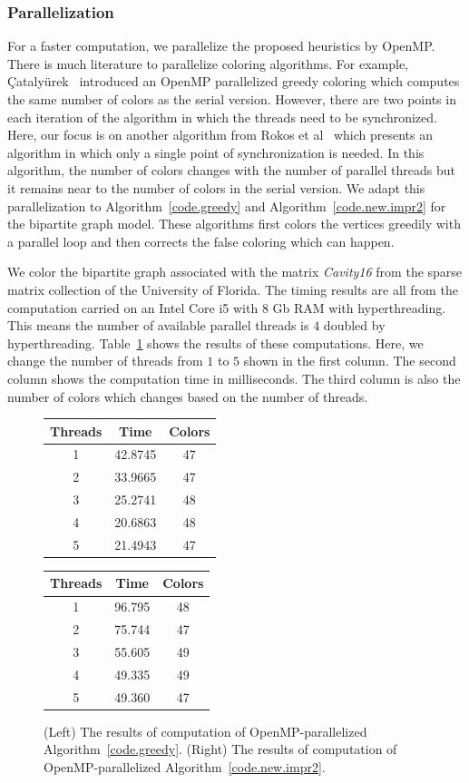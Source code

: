 \documentclass[12pt, twoside,a4paper,toc=bibliography]{scrbook}
\newcommand{\coderef}[1]{Algorithm~\protect\ref{#1}}
\begin{document}
\subsubsection{Parallelization}
\label{s.parallel}
For a faster computation, we parallelize the proposed heuristics by OpenMP.
There is much literature to parallelize coloring algorithms.
For example, {\c{C}}ataly{\"{u}}rek~\cite{cataly2012} introduced an OpenMP parallelized
greedy coloring which computes the same number of colors as the serial version.
However, there are two points in each iteration of the algorithm in which the threads
need to be synchronized.
Here, our focus is on another algorithm from Rokos et al~\cite{Rokos2015}
which presents an algorithm in which only a single point of synchronization is needed.
In this algorithm, the number of colors changes with the number of parallel threads
but it remains near to the number of colors in the serial version.
We adapt this parallelization to \coderef{code.greedy} and \coderef{code.new.impr2} for the bipartite graph model.
These algorithms first colors the vertices
greedily with a parallel loop and then corrects the false coloring which can happen.

We color the bipartite graph associated with the matrix \textit{Cavity16}
from the sparse matrix collection of the University of Florida.
The timing results are all from the computation carried on an Intel Core i5 with 8 Gb RAM with hyperthreading.
This means the number of available parallel threads is $4$ doubled by hyperthreading.
Table~\ref{omp.res} shows the results of these computations.
Here, we change the number of threads from $1$ to $5$ shown in the first column.
The second column shows the computation time in milliseconds. The third column
is also the number of colors which changes based on the number of threads.
\begin{figure}
\begin{tabular}{|c|c|c|}
\hline
Threads & Time & Colors \\\hline
1 & 42.8745 & 47 \\\hline
2 & 33.9665 & 47 \\\hline
3 & 25.2741 & 48 \\\hline
4 & 20.6863 & 48 \\\hline
5 & 21.4943 & 47 \\\hline
\end{tabular}\hfill
\begin{tabular}{|c|c|c|}
\hline
Threads & Time & Colors \\\hline
1 & 96.795 & 48 \\\hline
2 & 75.744 & 47 \\\hline
3 & 55.605 & 49 \\\hline
4 & 49.335 & 49 \\\hline
5 & 49.360 & 47 \\\hline
\end{tabular}
\caption{
(Left) The results of computation of OpenMP-parallelized \coderef{code.greedy}.
(Right) The results of computation of OpenMP-parallelized \coderef{code.new.impr2}.
}
\label{omp.res}
\end{figure}
\end{document}
